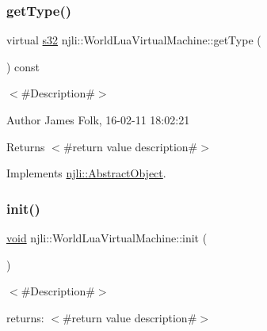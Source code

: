 \subsubsection{\texorpdfstring{get\+Type()}{getType()}}
{\footnotesize\ttfamily virtual \mbox{\hyperlink{_util_8h_aa62c75d314a0d1f37f79c4b73b2292e2}{s32}} njli\+::\+World\+Lua\+Virtual\+Machine\+::get\+Type (\begin{DoxyParamCaption}{ }\end{DoxyParamCaption}) const\hspace{0.3cm}{\ttfamily [virtual]}}



$<$\#\+Description\#$>$ 

\begin{DoxyAuthor}{Author}
James Folk, 16-\/02-\/11 18\+:02\+:21
\end{DoxyAuthor}
\begin{DoxyReturn}{Returns}
$<$\#return value description\#$>$ 
\end{DoxyReturn}


Implements \mbox{\hyperlink{classnjli_1_1_abstract_object_a08dcf202a47f0782813b8bc98c659e78}{njli\+::\+Abstract\+Object}}.

\mbox{\label{classnjli_1_1_world_lua_virtual_machine_af42ee292e12ae835a77eee13a1fb4c45}} 
\subsubsection{\texorpdfstring{init()}{init()}}
{\footnotesize\ttfamily \mbox{\hyperlink{_thread_8h_af1e856da2e658414cb2456cb6f7ebc66}{void}} njli\+::\+World\+Lua\+Virtual\+Machine\+::init (\begin{DoxyParamCaption}{ }\end{DoxyParamCaption})}

$<$\#\+Description\#$>$


\begin{DoxyItemize}
\item returns\+: $<$\#return value description\#$>$ 
\end{DoxyItemize}\mbox{\label{classnjli_1_1_world_lua_virtual_machine_aec5b70c9d15f38ca79a5f2a803152196}} 
